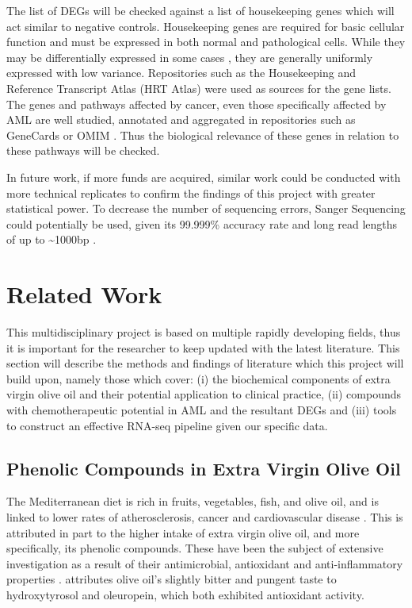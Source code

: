 The list of \ac{DEG}s will be checked against a list of housekeeping genes which will act similar to negative controls. Housekeeping genes are required for basic cellular function and must be expressed in both normal and pathological cells. While they may be differentially expressed in some cases \citep{greer2010housekeeping}, they are generally uniformly expressed with low variance. Repositories such as the Housekeeping and Reference Transcript Atlas (HRT Atlas) \citep{hounkpe2021hrt} were used as sources for the gene lists. %
The genes and pathways affected by cancer, even those specifically affected by \ac{AML} are well studied, annotated and aggregated in repositories such as GeneCards \citep{stelzer2016genecards} or OMIM \citep{hamosh2005online}. Thus the biological relevance of these genes in relation to these pathways will be checked.

In future work, if more funds are acquired, similar work could be conducted with more technical replicates to confirm the findings of this project with greater statistical power. To decrease the number of sequencing errors, Sanger Sequencing could potentially be used, given its 99.999\% accuracy rate and long read lengths of up to \textasciitilde 1000bp \citep{shendure2008next}.

\section{Related Work}
This multidisciplinary project is based on multiple rapidly developing fields, thus it is important for the researcher to keep updated with the latest literature. This section will describe the methods and findings of literature which this project will build upon, namely those which cover: (i) the biochemical components of extra virgin olive oil and their potential application to clinical practice, (ii) compounds with chemotherapeutic potential in \ac{AML} and the resultant \ac{DEG}s and (iii) tools to construct an effective RNA-seq pipeline given our specific data.


\subsection{Phenolic Compounds in Extra Virgin Olive Oil}
The Mediterranean diet is rich in fruits, vegetables, fish, and olive oil, and is linked to lower rates of atherosclerosis, cancer and cardiovascular disease \citep{owen2000, tripoli2005phenolic, cicerale2012antimicrobial, fabiani2002cancer}. This is attributed in part to the higher intake of extra virgin olive oil, and more specifically, its phenolic compounds. These have been the subject of extensive investigation as a result of their antimicrobial, antioxidant and anti-inflammatory properties \citep{cicerale2012antimicrobial, tripoli2005phenolic, bendini2007phenolic, serreli2018biological, iwen2000}. \cite{tripoli2005phenolic} attributes olive oil's slightly bitter and pungent taste to hydroxytyrosol and oleuropein, which both exhibited antioxidant activity.

